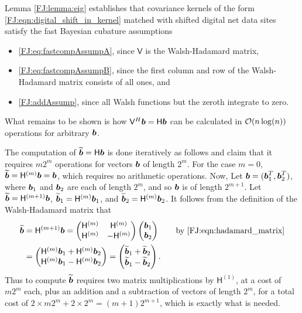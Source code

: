 \documentclass[graybox,footinfo]{svmult}
\begin{document}
Lemma \ref{FJ:lemma:eig} establishes that covariance kernels of the form \eqref{FJ:eqn:digital_shift_in_kernel} matched with shifted digital net data sites satisfy the fast Bayesian cubature assumptions
\begin{itemize}
    \item \eqref{FJ:eq:fastcompAssumpA}, since $\mathsf{V}$ is the Walsh-Hadamard matrix,
    
    \item  \eqref{FJ:eq:fastcompAssumpB}, since the first column and row of the  Walsh-Hadamard matrix consists of all ones, and
    
    \item \eqref{FJ:addAssump}, since all Walsh functions but the zeroth integrate to zero.
\end{itemize}
What remains to be shown is how $\mathsf{V}^H {\boldsymbol{b}} = \mathsf{H} {\boldsymbol{b}}$ can be calculated in ${\mathcal{O}}(n \log(n))$ operations for arbitrary ${\boldsymbol{b}}$.

The computation of $\widetilde{{\boldsymbol{b}}} =\mathsf{H} {\boldsymbol{b}}$ is done iteratively as follows and claim that it requires $m2^m$ operations for vectors ${\boldsymbol{b}}$ of length $2^m$. For the case $m=0$, $\widetilde{{\boldsymbol{b}}} = \mathsf{H}^{(m)} {\boldsymbol{b}} = {\boldsymbol{b}}$, which requires no arithmetic operations.  Now, Let ${\boldsymbol{b}} = ({\boldsymbol{b}}_1^{T},  {\boldsymbol{b}}_2^{T})$, where ${\boldsymbol{b}}_1$ and ${\boldsymbol{b}}_2$ are each of length $2^m$, and so ${\boldsymbol{b}}$ is of length $2^{m+1}$.  Let $\widetilde{{\boldsymbol{b}}} = \mathsf{H}^{(m+1)} {\boldsymbol{b}}$,  $\widetilde{{\boldsymbol{b}}}_1 = \mathsf{H}^{(m)} {\boldsymbol{b}}_1$, and $\widetilde{{\boldsymbol{b}}}_2 = \mathsf{H}^{(m)} {\boldsymbol{b}}_2$.  It follows from the definition of the Walsh-Hadamard matrix that 
\begin{align*}
\widetilde{{\boldsymbol{b}}} &= \mathsf{H}^{({m+1})} {\boldsymbol{b}} = \begin{pmatrix}
\mathsf{H}^{(m)} & \mathsf{H}^{(m)} \\ \mathsf{H}^{(m)} & - \mathsf{H}^{(m)}
\end{pmatrix} 
\begin{pmatrix}
{\boldsymbol{b}}_1 \\ {\boldsymbol{b}}_2
\end{pmatrix} \qquad \text{by \eqref{FJ:eqn:hadamard_matrix}} \\
&= 
\begin{pmatrix}
\mathsf{H}^{(m)} {\boldsymbol{b}}_1 + \mathsf{H}^{(m)}{\boldsymbol{b}}_2 \\ 
\mathsf{H}^{(m)} {\boldsymbol{b}}_1 - \mathsf{H}^{(m)} {\boldsymbol{b}}_2
\end{pmatrix}
= 
\begin{pmatrix}
\widetilde{{\boldsymbol{b}}}_1 + \widetilde{{\boldsymbol{b}}}_2 \\ 
\widetilde{{\boldsymbol{b}}}_1 - \widetilde{{\boldsymbol{b}}}_2
\end{pmatrix}.
\end{align*}
Thus to compute $\widetilde{{\boldsymbol{b}}}$ requires two matrix multiplications by $\mathsf{H}^{(1)}$, at a cost of $m 2^m$ each, plus an addition and a subtraction of vectors of length $2^m$, for a total cost of $2 \times m 2^m + 2 \times 2^m = (m+1) 2^{m+1}$, which is exactly what is needed.
\end{document}
